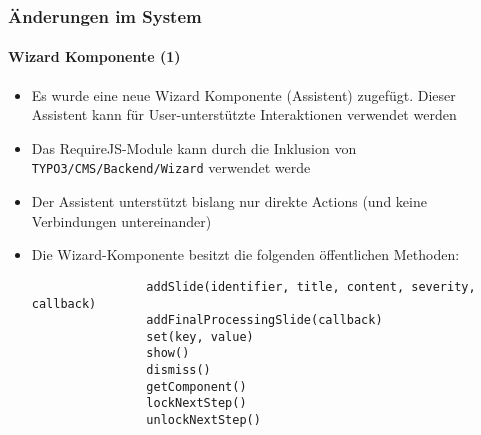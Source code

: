 \begin{frame}[fragile]
	\frametitle{Änderungen im System}
	\framesubtitle{Wizard Komponente (1)}

	\lstset{basicstyle=\tiny\ttfamily}

	\begin{itemize}

		\item Es wurde eine neue Wizard Komponente (Assistent) zugefügt. Dieser Assistent kann für User-unterstützte Interaktionen verwendet werden

		\item Das RequireJS-Module kann durch die Inklusion von \texttt{TYPO3/CMS/Backend/Wizard} verwendet werde

		\item Der Assistent unterstützt bislang nur direkte Actions\newline
			(und keine Verbindungen untereinander)

		\item Die Wizard-Komponente besitzt die folgenden öffentlichen Methoden:

			\begin{lstlisting}
				addSlide(identifier, title, content, severity, callback)
				addFinalProcessingSlide(callback)
				set(key, value)
				show()
				dismiss()
				getComponent()
				lockNextStep()
				unlockNextStep()
			\end{lstlisting}

	\end{itemize}

\end{frame}

